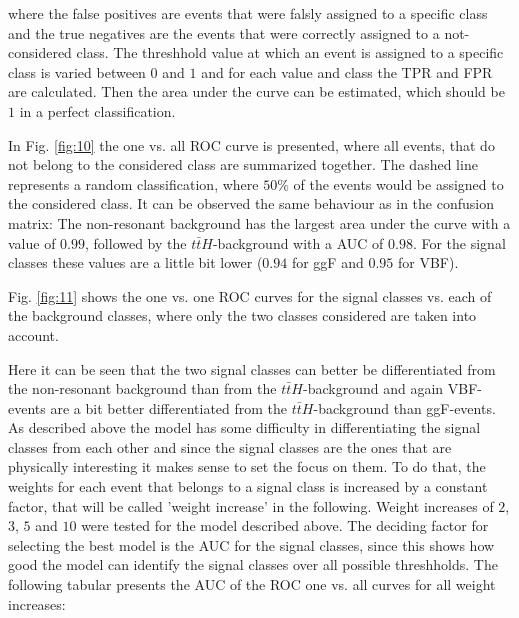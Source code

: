 
where the false positives are events that were falsly assigned to a specific class and the true negatives are the events that were correctly assigned to a not-considered class.
The threshhold value at which an event is assigned to a specific class is varied between $0$ and $1$ and for each value and class the TPR and FPR are calculated. Then the area under the curve can be estimated,
which should be $1$ in a perfect classification. 


In Fig. \ref{fig:10} the one vs. all ROC curve is presented,
where all events, that do not belong to the considered class are summarized together. The dashed line represents a random classification, where $50 \%$ of the events would be assigned to the considered
class. It can be observed the same behaviour as in the confusion matrix: The non-resonant background has the largest area under the curve with a value of $0.99$, followed by the $t \bar{t}H$-background with a AUC of $0.98$. For the signal classes these
values are a little bit lower ($0.94$ for ggF and $0.95$ for VBF).

Fig. \ref{fig:11} shows the one vs. one ROC curves for the signal classes vs. each of the background classes, where only the two classes considered are taken into account. 


Here it can be seen that the two signal classes can better be differentiated from the non-resonant background than from the $t \bar{t}H$-background and again VBF-events are a bit
better differentiated from the $t \bar{t}H$-background than ggF-events. \\

As described above the model has some difficulty in differentiating the signal classes from each other and since the signal classes are the ones that are physically interesting it makes
sense to set the focus on them. To do that, the weights for each event that belongs to a signal class is increased by a constant factor, that will be called 'weight increase' in the following. 
Weight increases of $2$, $3$, $5$ and $10$ were tested for the model described above. The deciding factor for selecting the best model is the AUC for the signal classes, since this shows
how good the model can identify the signal classes over all possible threshholds. The following tabular presents the AUC of the ROC one vs. all curves for all weight increases:


